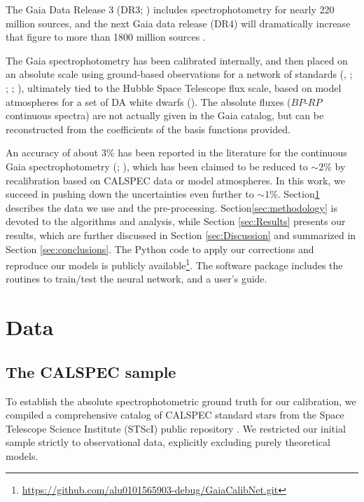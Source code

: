 \documentclass{aa}
\begin{document}
The Gaia Data Release 3 (DR3; \citealt{gaia_dr3_2023}) includes spectrophotometry for nearly 220 million sources, and the next Gaia data release (DR4) will dramatically increase that figure to more than 1800 million sources \citep{gaia_dr4_web}.

The Gaia spectrophotometry has been calibrated internally, and then placed on an absolute scale using ground-based observations for a network of standards (\citealt{pancino2012}, \citeyear{pancino2022}; \citealt{carrasco2021}; \citealt{montegriffo2023gaia}; \citealt{de_angeli_2023}), ultimately tied to the Hubble Space Telescope flux scale, based on model atmospheres for a set of DA white dwarfs (\citealt{bohlin2014}). The absolute fluxes ($BP$-$RP$ continuous spectra) are not actually given in the Gaia catalog, but can be reconstructed from the coefficients of the basis functions provided.

An accuracy of about 3\% has been reported in the literature for the continuous Gaia spectrophotometry (\citealt{huang2024}; \citealt{ye2025}), which has been claimed to be reduced to $\sim 2\%$ by recalibration based on CALSPEC data or model atmospheres. In this work, we succeed in pushing down the uncertainties even further to $\sim 1\%$. Section\ref{sec:Data} describes the data we use and the pre-processing. Section\ref{sec:methodology} is devoted to the algorithms and analysis, while Section \ref{sec:Results} presents our results, which are further discussed in Section \ref{sec:Discussion} and summarized in Section \ref{sec:conclusions}. The Python code to apply our corrections and reproduce our models is publicly available\footnote{\url{https://github.com/alu0101565903-debug/GaiaCalibNet.git}}. The software package includes the routines to train/test the neural network, and a user's guide.


\section{Data} \label{sec:Data}
\subsection{The CALSPEC sample} \label{calspec_sample}

To establish the absolute spectrophotometric ground truth for our calibration, we compiled a comprehensive catalog of CALSPEC standard stars from the Space Telescope Science Institute (STScI) public repository \citep{bohlin2014, bohlin2020, bohlin2022}. We restricted our initial sample strictly to observational data, explicitly excluding purely theoretical models.
\end{document}
